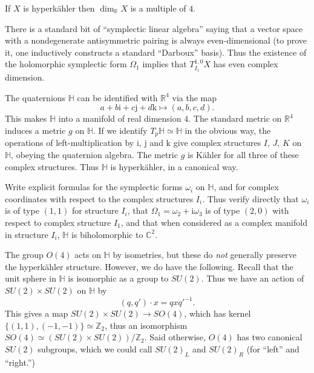 \documentclass[12pt,letterpaper,reqno]{amsart}
\numberwithin{equation}{section}
\newcommand{\R}{\ensuremath{\mathbb R}}
\newcommand{\C}{\ensuremath{\mathbb C}}
\newcommand{\Z}{\ensuremath{\mathbb Z}}
\newcommand{\bbH}{\ensuremath{\mathbb H}}
\newcommand{\kahler}{K\"ahler\xspace}
\newcommand{\hk}{hyperk\"ahler\xspace}
\newcommand{\Hk}{Hyperk\"ahler\xspace}
\newcommand{\I}{{\mathrm i}}
\newcommand{\J}{{\mathrm j}}
\newcommand{\K}{{\mathrm k}}
\newcommand{\ti}[1]{\textit{#1}}
\begin{document}
\begin{cor}[\Hk manifolds have dimension $4n$] If $X$ is \hk then $\dim_\R X$ is a multiple of $4$.
\end{cor}
\begin{pf} There is a standard bit of ``symplectic linear algebra'' saying that a vector space with a
nondegenerate antisymmetric pairing is always 
even-dimensional (to prove it, one inductively constructs
a standard ``Darboux'' basis). Thus the existence of the 
holomorphic symplectic form $\Omega_1$ implies
that $T^{1,0}_{I_1} X$ has even complex dimension.
\end{pf}

\begin{example} The quaternions
$\bbH$ can be identified with $\R^4$
via the map
\begin{equation}
  a + b \I + c \J + d \K \mapsto (a,b,c,d).
\end{equation}
This makes $\bbH$ into a manifold of real 
dimension $4$.
The standard metric on $\R^4$ induces a metric
$g$ on $\bbH$.
If we identify $T_p \bbH \simeq \bbH$ 
in the obvious way,
the operations of left-multiplication by $\I$, $\J$ and $\K$
give complex structures $I$, $J$, $K$ on $\bbH$,
obeying the quaternion algebra.
The metric $g$ is \kahler for all three of these complex
structures. Thus $\bbH$ is \hk, in a canonical way.
\end{example}

\begin{exercise} \label{exc:flat-space-computing}
Write explicit formulas for the symplectic forms
$\omega_i$ on $\bbH$, and for complex coordinates
with respect to the complex structures $I_i$.
Thus verify directly that $\omega_i$ is of type $(1,1)$
for structure $I_i$, that
$\Omega_1 = \omega_2 + \I \omega_3$
is of type $(2,0)$ with respect to complex structure
$I_1$, and that when considered as a complex
manifold in structure $I_i$, $\bbH$ is biholomorphic
to $\C^2$.
\end{exercise}

The group $O(4)$ acts on $\bbH$ by isometries, but 
these do \ti{not} generally preserve the \hk structure.
However, we do have the following. Recall that the 
unit sphere in ${\mathbb H}$ is isomorphic as a group
to $SU(2)$. Thus we have an action of $SU(2) \times SU(2)$ 
on ${\mathbb H}$ by
\begin{equation}
  (q, q') \cdot x = q x q'^{-1}.
\end{equation}
This gives a map $SU(2) \times SU(2) \to SO(4)$, which
has kernel $\{(1,1),(-1,-1)\} \simeq \Z_2$, thus an isomorphism
$SO(4) \simeq (SU(2) \times SU(2)) / \Z_2$.
Said otherwise, $O(4)$ has two canonical $SU(2)$ subgroups,
which we could call $SU(2)_L$ and $SU(2)_R$ (for ``left'' and ``right.'')
\end{document}
